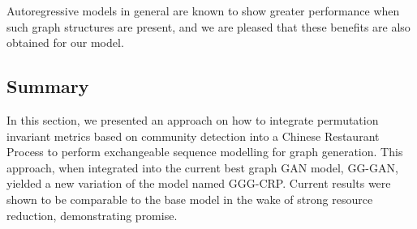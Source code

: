 Autoregressive models in general are known to show greater performance when such graph structures are present, and we are pleased that these benefits are also obtained for our model.

\subsection{Summary}
\label{sec:conclusion}

In this section, we presented an approach on how to integrate permutation invariant metrics based on community detection into a Chinese Restaurant Process to perform exchangeable sequence modelling for graph generation. This approach, when integrated into the current best graph GAN model, GG-GAN, yielded a new variation of the model named GGG-CRP. Current results were shown to be comparable to the base model in the wake of strong resource reduction, demonstrating promise. 